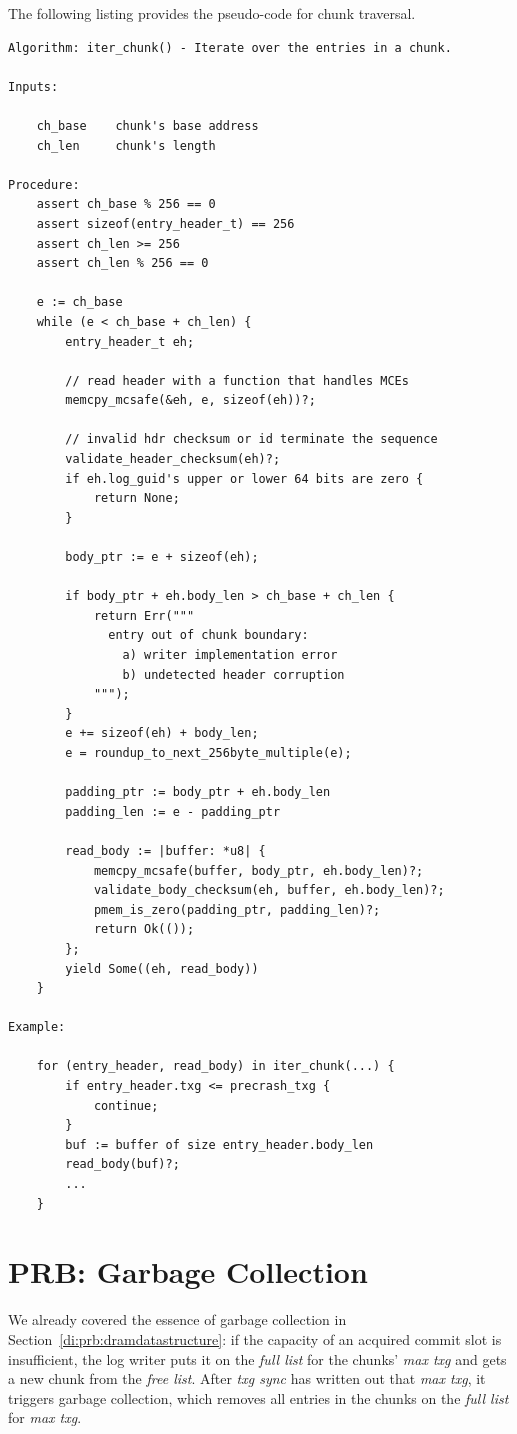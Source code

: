 \documentclass[12pt,a4paper,twoside]{book}
\begin{document}
{The following listing provides the pseudo-code for chunk traversal.
\begin{lstlisting}[style=figurepseudocode]
Algorithm: iter_chunk() - Iterate over the entries in a chunk.

Inputs:

    ch_base    chunk's base address
    ch_len     chunk's length

Procedure:
    assert ch_base % 256 == 0
    assert sizeof(entry_header_t) == 256
    assert ch_len >= 256
    assert ch_len % 256 == 0

    e := ch_base
    while (e < ch_base + ch_len) {
        entry_header_t eh;

        // read header with a function that handles MCEs
        memcpy_mcsafe(&eh, e, sizeof(eh))?;

        // invalid hdr checksum or id terminate the sequence
        validate_header_checksum(eh)?;
        if eh.log_guid's upper or lower 64 bits are zero {
            return None;
        }

        body_ptr := e + sizeof(eh);

        if body_ptr + eh.body_len > ch_base + ch_len {
            return Err("""
              entry out of chunk boundary:
                a) writer implementation error
                b) undetected header corruption
            """);
        }
        e += sizeof(eh) + body_len;
        e = roundup_to_next_256byte_multiple(e);

        padding_ptr := body_ptr + eh.body_len
        padding_len := e - padding_ptr

        read_body := |buffer: *u8| {
            memcpy_mcsafe(buffer, body_ptr, eh.body_len)?;
            validate_body_checksum(eh, buffer, eh.body_len)?;
            pmem_is_zero(padding_ptr, padding_len)?;
            return Ok(());
        };
        yield Some((eh, read_body))
    }

Example:

    for (entry_header, read_body) in iter_chunk(...) {
        if entry_header.txg <= precrash_txg {
            continue;
        }
        buf := buffer of size entry_header.body_len
        read_body(buf)?;
        ...
    }
\end{lstlisting}

\section{PRB: Garbage Collection}\label{di:prb:gc}
We already covered the essence of garbage collection in Section~\ref{di:prb:dramdatastructure}:
if the capacity of an acquired commit slot is insufficient, the log writer puts it on the \textit{full list} for the chunks' \textit{max txg} and gets a new chunk from the \textit{free list}.
After \textit{txg sync} has written out that \textit{max txg}, it triggers garbage collection, which removes all entries in the chunks on the \textit{full list} for \textit{max txg}.

}
\end{document}
